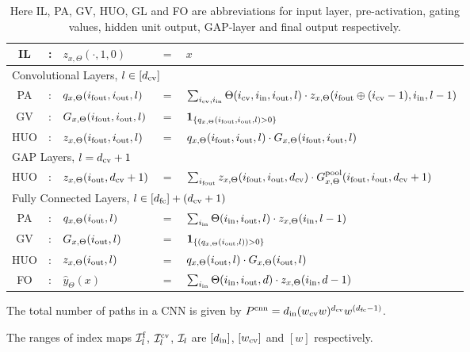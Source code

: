 \begin{table}[t]
\centering
\begin{tabular}{|c l lll|}\hline
IL&: &$z_{x,\Theta}(\cdot,1,0)$ &$=$ &$x$ \\\hline\hline
\multicolumn{5}{|l|}{Convolutional Layers, $l\in[d_{\text{cv}}]$}\\\hline\hline
PA&: & $q_{x,\Theta}(i_{\text{fout}},i_{\text{out}},l)$& $=$ & $\sum_{i_{\text{cv}},i_{\text{in}}}\Theta(i_{\text{cv}},i_{\text{in}},i_{\text{out}},l)\cdot z_{x,\Theta}(i_{\text{fout}}\oplus (i_{\text{cv}}-1),i_{\text{in}},l-1)$\\
GV&: &$G_{x,\Theta}(i_{\text{fout}},i_{\text{out}},l)$& $=$ & $\mathbf{1}_{\{q_{x,\Theta}(i_{\text{fout}},i_{\text{out}},l)>0\}}$\\
HUO&: &$z_{x,\Theta}(i_{\text{fout}},i_{\text{out}},l)$ & $=$ & $q_{x,\Theta}(i_{\text{fout}},i_{\text{out}},l)\cdot G_{x,\Theta}(i_{\text{fout}},i_{\text{out}},l)$\\\hline\hline
\multicolumn{5}{|l|}{GAP Layers, $l=d_{\text{cv}}+1$}\\\hline\hline
HUO&: &$z_{x,\Theta}(i_{\text{out}}, d_{\text{cv}}+1)$ & $=$ &$\sum_{i_{\text{fout}}} z_{x,\Theta}(i_{\text{fout}},i_{\text{out}},d_{\text{cv}})\cdot G^{\text{pool}}_{x,\Theta}(i_{\text{fout}},i_{\text{out}},d_{\text{cv}}+1)$\\\hline\hline
\multicolumn{5}{|l|}{Fully Connected Layers, $l\in[d_{\text{fc}}]+(d_{\text{cv}}+1)$}\\\hline\hline
PA&: & $q_{x,\Theta}(i_{\text{out}},l)$& $=$ & $\sum_{i_{\text{in}}}\Theta(i_{\text{in}},i_{\text{out}},l) \cdot z_{x,\Theta}(i_{\text{in}},l-1) $\\
GV&: &$G_{x,\Theta}(i_{\text{out}},l)$& $=$ & $\mathbf{1}_{\{(q_{x,\Theta}(i_{\text{out}},l))>0\}}$\\
HUO&: &$z_{x,\Theta}(i_{\text{out}},l)$ & $=$ & $q_{x,\Theta}(i_{\text{out}},l)\cdot G_{x,\Theta}(i_{\text{out}},l)$\\
FO&: & $\hat{y}_{\Theta}(x)$ & $=$ & $\sum_{i_{\text{in}}}\Theta(i_{\text{in}},i_{\text{out}}, d)\cdot z_{x,\Theta}(i_{\text{in}},d-1)$\\\hline
\end{tabular}
\caption{Here IL, PA, GV, HUO, GL and FO are abbreviations for input layer, pre-activation, gating values, hidden unit output, GAP-layer and final output respectively.}
\label{tb:cconv}
\end{table}

\begin{proposition}
The total number of paths in a CNN is given by  $P^{\text{cnn}}=d_{\text{in}}(w_{\text{cv}} w)^{d_{\text{cv}}}w^{(d_{\text{fc}}-1)}$.
\end{proposition}

\begin{notation}
The ranges of index maps $\mathcal{I}^{\text{f}}_l$,  $\mathcal{I}^{\text{cv}}_l$, $\mathcal{I}_l$ are $[d_{\text{in}}]$, $[w_{\text{cv}}]$ and $[w]$ respectively. 
\end{notation}

